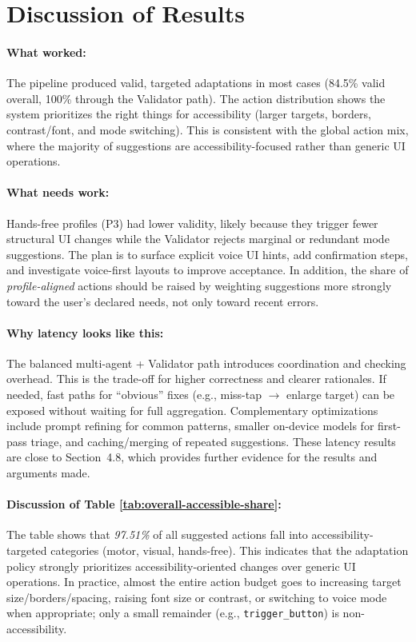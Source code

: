 \documentclass[openany]{book}
\begin{document}
\section{Discussion of Results}
\paragraph{What worked:}
The pipeline produced valid, targeted adaptations in most cases (84.5\% valid overall, 100\% through the Validator path). The action distribution shows the system prioritizes the right things for accessibility (larger targets, borders, contrast/font, and mode switching). This is consistent with the global action mix, where the majority of suggestions are accessibility-focused rather than generic UI operations.

\paragraph{What needs work:}
Hands-free profiles (P3) had lower validity, likely because they trigger fewer structural UI changes while the Validator rejects marginal or redundant mode suggestions. The plan is to surface explicit voice UI hints, add confirmation steps, and investigate voice-first layouts to improve acceptance. In addition, the share of \emph{profile-aligned} actions should be raised by weighting suggestions more strongly toward the user’s declared needs, not only toward recent errors.

\paragraph{Why latency looks like this:}
The balanced multi-agent + Validator path introduces coordination and checking overhead. This is the trade-off for higher correctness and clearer rationales. If needed, fast paths for “obvious” fixes (e.g., miss-tap $\rightarrow$ enlarge target) can be exposed without waiting for full aggregation. Complementary optimizations include prompt refining for common patterns, smaller on-device models for first-pass triage, and caching/merging of repeated suggestions. These latency results are close to Section~4.8, which provides further evidence for the results and arguments made.

\paragraph{Discussion of Table \ref{tab:overall-accessible-share}:}
The table shows that \emph{97.51\%} of all suggested actions fall into accessibility-targeted categories (motor, visual, hands-free). This indicates that the adaptation policy strongly prioritizes accessibility-oriented changes over generic UI operations. In practice, almost the entire action budget goes to increasing target size/borders/spacing, raising font size or contrast, or switching to voice mode when appropriate; only a small remainder (e.g., \texttt{trigger\_button}) is non-accessibility.
\end{document}
